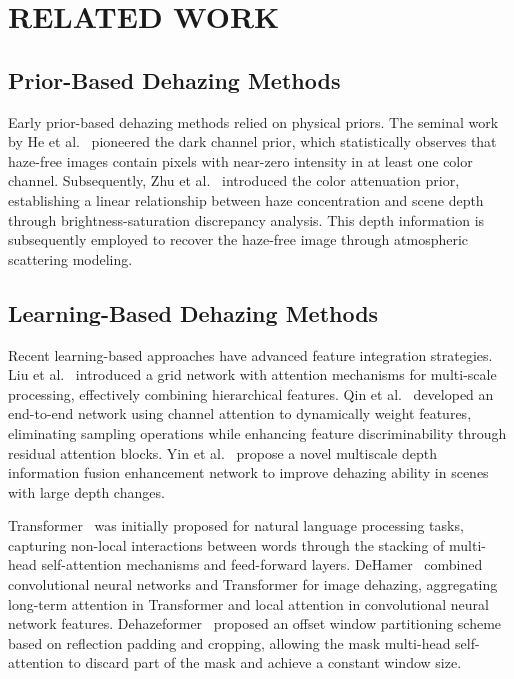 \documentclass[journal]{IEEEtran}
\begin{document}
\section{RELATED WORK}
\subsection{Prior-Based Dehazing Methods}
Early prior-based dehazing methods relied on physical priors. The seminal work by He et al.~\cite{he2010single} pioneered the dark channel prior, which statistically observes that haze-free images contain pixels with near-zero intensity in at least one color channel. Subsequently, Zhu et al.~\cite{zhu2015fast} introduced the color attenuation prior, establishing a linear relationship between haze concentration and scene depth through brightness-saturation discrepancy analysis. This depth information is subsequently employed to recover the haze-free image through atmospheric scattering modeling.

\subsection{Learning-Based Dehazing Methods}
Recent learning-based approaches have advanced feature integration strategies. Liu et al.~\cite{liu2019griddehazenet} introduced a grid network with attention mechanisms for multi-scale processing, effectively combining hierarchical features. Qin et al.~\cite{qin2020ffa} developed an end-to-end network using channel attention to dynamically weight features, eliminating sampling operations while enhancing feature discriminability through residual attention blocks. Yin et al.~\cite{yin2023multiscale} propose a novel multiscale depth information fusion enhancement network to improve dehazing ability in scenes with large depth changes.

Transformer~\cite{vaswani2017attention} was initially proposed for natural language processing tasks, capturing non-local interactions between words through the stacking of multi-head self-attention mechanisms and feed-forward layers. DeHamer~\cite{guo2022image} combined convolutional neural networks and Transformer for image dehazing, aggregating long-term attention in Transformer and local attention in convolutional neural network features. Dehazeformer~\cite{song2023vision} proposed an offset window partitioning scheme based on reflection padding and cropping, allowing the mask multi-head self-attention to discard part of the mask and achieve a constant window size.
\end{document}
